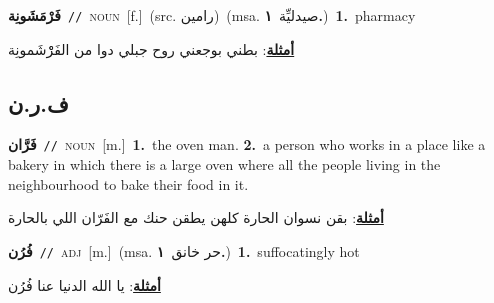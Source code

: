 \documentclass[10pt,a4paper,twoside]{article} %
\begin{document}
\begin{multicols}{2}
{\setlength\topsep{0pt}\textbf{\foreignlanguage{arabic}{فَرْمَشَونِة}}\ {\color{gray}\texttt{//}\color{black}}\ \textsc{noun}\ [f.]\ (src. \color{gray}\foreignlanguage{arabic}{رامين}\color{black})\ \color{gray}(msa. \foreignlanguage{arabic}{صيدليِّة}~\foreignlanguage{arabic}{\textbf{١.}})\color{black}\ \textbf{1.}~pharmacy\  \begin{flushright}\color{gray}\foreignlanguage{arabic}{\textbf{\underline{\foreignlanguage{arabic}{أمثلة}}}: بطني بوجعني روح جبلي دوا من الفَرْْشَمونِة}\end{flushright}\color{black}} \vspace{2mm}

\vspace{-3mm}
\subsection*{\color{blue}\foreignlanguage{arabic}{ف.ر.ن}\color{blue}{}} 

{\setlength\topsep{0pt}\textbf{\foreignlanguage{arabic}{فَرَّان}}\ {\color{gray}\texttt{//}\color{black}}\ \textsc{noun}\ [m.]\ \textbf{1.}~the oven man.  \textbf{2.}~a person who works in a place like a bakery in which there is a large oven where all the people living in the neighbourhood to bake their food in it.\  \begin{flushright}\color{gray}\foreignlanguage{arabic}{\textbf{\underline{\foreignlanguage{arabic}{أمثلة}}}: بقن نسوان الحارة كلهن يطقن حنك مع الفَرّان اللي بالحارة}\end{flushright}\color{black}} \vspace{2mm}

{\setlength\topsep{0pt}\textbf{\foreignlanguage{arabic}{فُرُن}}\ {\color{gray}\texttt{//}\color{black}}\ \textsc{adj}\ [m.]\ \color{gray}(msa. \foreignlanguage{arabic}{حر خانق}~\foreignlanguage{arabic}{\textbf{١.}})\color{black}\ \textbf{1.}~suffocatingly hot\  \begin{flushright}\color{gray}\foreignlanguage{arabic}{\textbf{\underline{\foreignlanguage{arabic}{أمثلة}}}: يا الله الدنيا عنا فُرُن}\end{flushright}\color{black}} \vspace{2mm}


\end{multicols}
\end{document}
